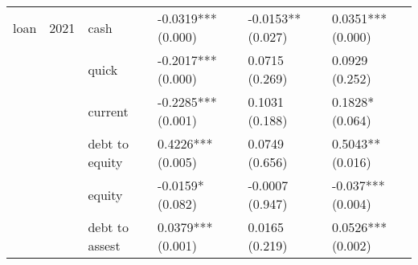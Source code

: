\begin{tabular}{llllll}
loan & 2021 & cash &  -0.0319*** (0.000) &  -0.0153** (0.027) &   0.0351*** (0.000) \\
     &      & quick &  -0.2017*** (0.000) &     0.0715 (0.269) &      0.0929 (0.252) \\
     &      & current &  -0.2285*** (0.001) &     0.1031 (0.188) &     0.1828* (0.064) \\
     &      & debt to equity &   0.4226*** (0.005) &     0.0749 (0.656) &    0.5043** (0.016) \\
     &      & equity &    -0.0159* (0.082) &    -0.0007 (0.947) &   -0.037*** (0.004) \\
     &      & debt to assest &   0.0379*** (0.001) &     0.0165 (0.219) &   0.0526*** (0.002) \\
\bottomrule
\end{tabular}
